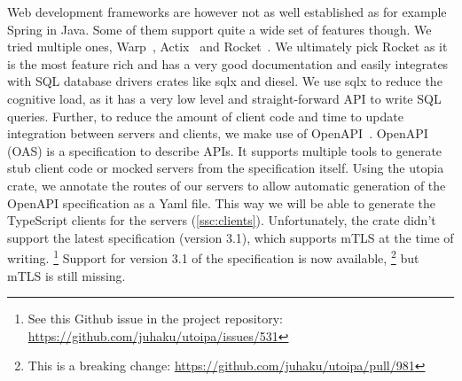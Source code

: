 Web development frameworks are however not as well established
as for example Spring in Java. Some of them support quite a wide
set of features though. 
We tried multiple ones, Warp~\cite{Warp}, 
Actix~\cite{Actix} and Rocket~\cite{Rocket}.
We ultimately pick Rocket as it is the most feature rich
and has a very good documentation and easily integrates with
SQL database drivers crates like sqlx and diesel.
We use sqlx to reduce the cognitive load, as it has a very
low level and straight-forward API to write SQL queries.
Further, to reduce the amount of client code and time to update
integration between servers and clients, we make use of OpenAPI~\cite{OpenAPISurvey}.
OpenAPI (OAS) is a specification to describe APIs. It supports
multiple tools to generate stub client code or mocked servers from
the specification itself.
Using the utopia crate, we annotate the routes of our servers
to allow automatic generation of the OpenAPI specification as 
a Yaml file. This way we will be able to generate the TypeScript
clients for the servers (\cref{ssc:clients}). Unfortunately,
the crate didn't support the latest specification (version 3.1), 
which supports mTLS at the time of writing.
\footnote{See this Github issue in the project repository: \url{https://github.com/juhaku/utoipa/issues/531}}
Support for version 3.1 of the specification is now available,
\footnote{This is a breaking change: \url{https://github.com/juhaku/utoipa/pull/981}}
but mTLS is still missing.



